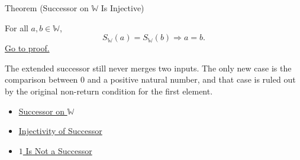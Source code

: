 \begin{theorembox}{Theorem (Successor on \texorpdfstring{$\mathbb{W}$}{W} Is Injective)}
\begin{theorem}
\label{thm:successor-on-w-injective}
For all $a,b\in\mathbb{W}$,
\[
S_{\mathbb{W}}(a)=S_{\mathbb{W}}(b)\Longrightarrow a=b.
\]
\hyperref[prf:successor-on-w-injective]{Go to proof.}
\end{theorem}
\end{theorembox}

\begin{remark*}[Interpretation]
The extended successor still never merges two inputs. The only new case is the
comparison between $0$ and a positive natural number, and that case is ruled
out by the original non-return condition for the first element.
\end{remark*}

\begin{dependencies}
\begin{itemize}
  \item \hyperref[def:successor-on-w]{Successor on $\mathbb{W}$}
  \item \hyperref[ax:peano-successor-injective]{Injectivity of Successor}
  \item \hyperref[ax:peano-one-not-successor]{$1$ Is Not a Successor}
\end{itemize}
\end{dependencies}
